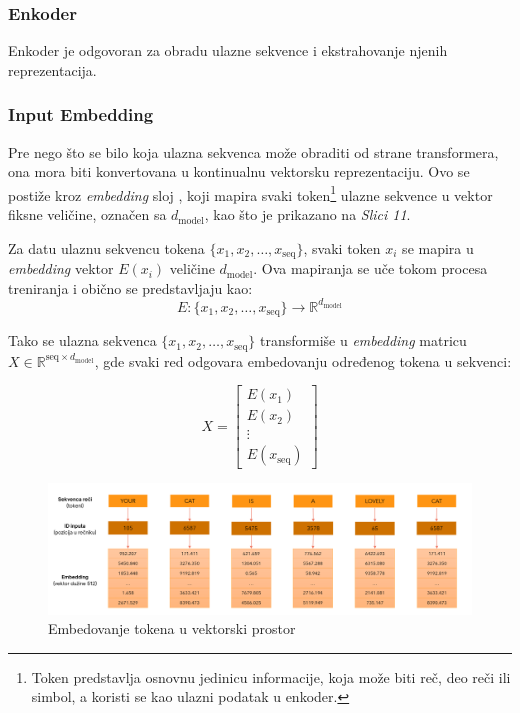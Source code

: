\documentclass[12pt]{article}
\begin{document}
   \subsubsection{Enkoder}
   Enkoder je odgovoran za obradu ulazne sekvence i ekstrahovanje njenih reprezentacija.

   \subsubsection*{Input Embedding}

   Pre nego što se bilo koja ulazna sekvenca može obraditi od strane transformera, 
   ona mora biti konvertovana u kontinualnu vektorsku reprezentaciju. 
   Ovo se postiže kroz \textit{embedding} sloj , 
   koji mapira svaki token\footnote{Token predstavlja osnovnu jedinicu 
   informacije, koja može biti reč, deo reči ili simbol, a koristi se kao 
   ulazni podatak u enkoder.} ulazne sekvence u vektor fiksne veličine, 
   označen sa \( d_{\text{model}} \), kao što je prikazano na \textit{Slici 11}.

   \newpage
   Za datu ulaznu sekvencu tokena \(\{x_1, x_2, \dots, x_\text{seq}\}\), 
   svaki token \(x_i\) se mapira u \textit{embedding} vektor \(E(x_i)\) 
   veličine \( d_{\text{model}} \). Ova mapiranja se uče tokom procesa treniranja 
   i obično se predstavljaju kao:
   \[
   E: \{x_1, x_2, \dots, x_\text{seq}\} \rightarrow \mathbb{R}^{d_{\text{model}}}
   \]

   Tako se ulazna sekvenca \(\{x_1, x_2, \dots, x_\text{seq}\}\) transformiše u 
   \textit{embedding} matricu \(X \in \mathbb{R}^{\text{seq} \times d_{\text{model}}}\), gde svaki 
   red odgovara embedovanju određenog tokena u sekvenci:

   \[
   X = \begin{bmatrix}
   E(x_1) \\
   E(x_2) \\
   \vdots \\
   E(x_\text{seq})
   \end{bmatrix}
   \]

   \begin{figure}[h!]
      \hspace{-2cm} %
      \includegraphics[width=1.3\textwidth]{token.png}
      \caption{Embedovanje tokena u vektorski prostor}
      \label{fig:token_embedding}
   \end{figure}
\end{document}
